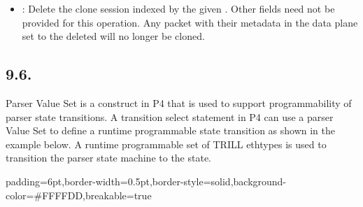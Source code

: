 \documentclass[11pt]{article}
\begin{document}
{\begin{itemize}[noitemsep,topsep=\mdcompacttopsep]
\item{}: Delete the clone session indexed by the given
. Other fields need not be provided for this operation. Any
packet with their  metadata in the data plane set to the
deleted  will no longer be cloned.%
\end{itemize}%

\subsection{9.6.\hspace*{0.5em}}\label{sec-valuesetentry}%

\noindent{}Parser Value Set is a construct in P4 that is used to support programmability of
parser state transitions. A transition select statement in P4 can use a parser
Value Set to define a runtime programmable state transition as shown in the
example below. A runtime programmable set of TRILL ethtypes is used to
transition the parser state machine to the  state.%

\begin{mdbmargintb}{6pt}{6pt}%
\begin{mdblock}{padding=6pt,border-width=0.5pt,border-style=solid,background-color=\#FFFFDD,breakable=true}%
\begin{mdpre}%
\end{mdpre}%
\end{mdblock}%
\end{mdbmargintb}%

}
\end{document}
